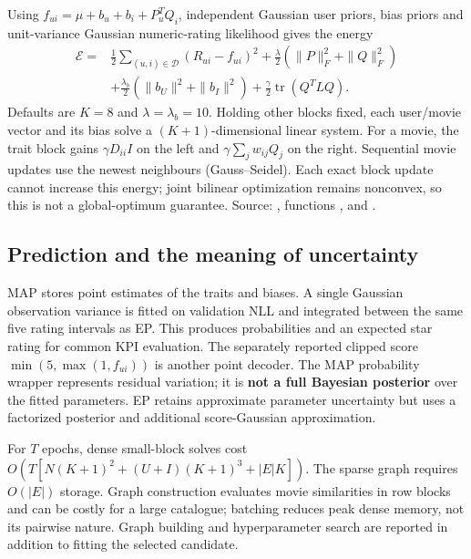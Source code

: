 Using $f_{ui}=\mu+b_u+b_i+P_u^TQ_i$, independent Gaussian user priors, bias
priors and unit-variance Gaussian numeric-rating likelihood gives the energy
\begin{equation}
\begin{split}
\mathcal E={}&\frac12\sum_{(u,i)\in\mathcal D}(R_{ui}-f_{ui})^2
+\frac\lambda2(\|P\|_F^2+\|Q\|_F^2)\\
&+\frac{\lambda_b}{2}(\|b_U\|^2+\|b_I\|^2)
+\frac\gamma2\operatorname{tr}(Q^TLQ).
\end{split}\label{eq:energy}
\end{equation}
Defaults are $K=8$ and $\lambda=\lambda_b=10$. Holding other blocks fixed,
each user/movie vector and its bias solve a $(K+1)$-dimensional linear system.
For a movie, the trait block gains $\gamma D_{ii}I$ on the left and
$\gamma\sum_jw_{ij}Q_j$ on the right. Sequential movie updates use the newest
neighbours (Gauss--Seidel). Each exact block update cannot increase this energy;
joint bilinear optimization remains nonconvex, so this is not a global-optimum
guarantee. Source: , functions ,  and
.

\subsection{Prediction and the meaning of uncertainty}
MAP stores point estimates of the traits and biases. A single Gaussian
observation variance is fitted on validation NLL and integrated between the
same five rating intervals as EP. This produces probabilities and an expected
star rating for common KPI evaluation. The separately reported clipped score
$\min(5,\max(1,f_{ui}))$ is another point decoder. The MAP probability wrapper
represents residual variation; it is \textbf{not a full Bayesian posterior}
over the fitted parameters. EP retains approximate parameter uncertainty but
uses a factorized posterior and additional score-Gaussian approximation.

For $T$ epochs, dense small-block solves cost
$O(T[N(K+1)^2+(U+I)(K+1)^3+|E|K])$. The sparse graph requires $O(|E|)$
storage. Graph construction evaluates movie similarities in row blocks and can
be costly for a large catalogue; batching reduces peak dense memory, not its
pairwise nature. Graph building and hyperparameter search are reported in
addition to fitting the selected candidate.
